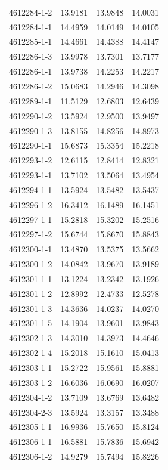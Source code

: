 \begin{longtable}{lrrr}
4612284-1-2 & 13.9181 & 13.9848 & 14.0031 \\
4612284-1-1 & 14.4959 & 14.0149 & 14.0105 \\
4612285-1-1 & 14.4661 & 14.4388 & 14.4147 \\
4612286-1-3 & 13.9978 & 13.7301 & 13.7177 \\
4612286-1-1 & 13.9738 & 14.2253 & 14.2217 \\
4612286-1-2 & 15.0683 & 14.2946 & 14.3098 \\
4612289-1-1 & 11.5129 & 12.6803 & 12.6439 \\
4612290-1-2 & 13.5924 & 12.9500 & 13.9497 \\
4612290-1-3 & 13.8155 & 14.8256 & 14.8973 \\
4612290-1-1 & 15.6873 & 15.3354 & 15.2218 \\
4612293-1-2 & 12.6115 & 12.8414 & 12.8321 \\
4612293-1-1 & 13.7102 & 13.5064 & 13.4954 \\
4612294-1-1 & 13.5924 & 13.5482 & 13.5437 \\
4612296-1-2 & 16.3412 & 16.1489 & 16.1451 \\
4612297-1-1 & 15.2818 & 15.3202 & 15.2516 \\
4612297-1-2 & 15.6744 & 15.8670 & 15.8843 \\
4612300-1-1 & 13.4870 & 13.5375 & 13.5662 \\
4612300-1-2 & 14.0842 & 13.9670 & 13.9189 \\
4612301-1-1 & 13.1224 & 13.2342 & 13.1926 \\
4612301-1-2 & 12.8992 & 12.4733 & 12.5278 \\
4612301-1-3 & 14.3636 & 14.0237 & 14.0270 \\
4612301-1-5 & 14.1904 & 13.9601 & 13.9843 \\
4612302-1-3 & 14.3010 & 14.3973 & 14.4646 \\
4612302-1-4 & 15.2018 & 15.1610 & 15.0413 \\
4612303-1-1 & 15.2722 & 15.9561 & 15.8881 \\
4612303-1-2 & 16.6036 & 16.0690 & 16.0207 \\
4612304-1-2 & 13.7109 & 13.6769 & 13.6482 \\
4612304-2-3 & 13.5924 & 13.3157 & 13.3488 \\
4612305-1-1 & 16.9936 & 15.7650 & 15.8124 \\
4612306-1-1 & 16.5881 & 15.7836 & 15.6942 \\
4612306-1-2 & 14.9279 & 15.7494 & 15.8226 \\

\end{longtable}
